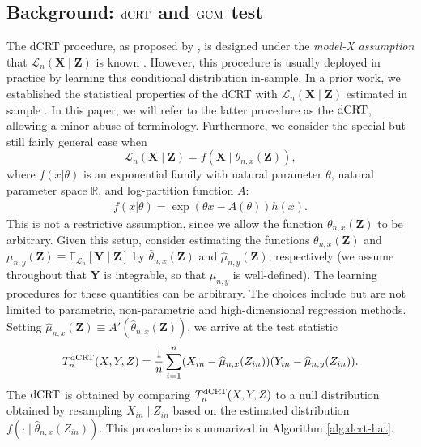 \documentclass[12pt]{article}
\theoremstyle{definition}
\newcommand{\E}{\mathbb E}								%
\newcommand{\R}{\mathbb{R}}								%
\newcommand{\prx}{\bm X}								%
\newcommand{\srx}{X}									%
\newcommand{\prz}{\bm Z}								%
\newcommand{\srz}{Z}									%
\newcommand{\pry}{{\bm Y}}								%
\newcommand{\sry}{Y}									%
\newcommand{\law}{\mathcal L}							%
\newcommand{\dCRT}{\textnormal{dCRT}} 					%
\newcommand{\GCM}{\textnormal{GCM}}						%
\begin{document}
\subsection{Background: $\dCRT$ and $\GCM$ test}\label{sec:background}

The dCRT procedure, as proposed by \citet{Liu2022a}, is designed under the \textit{model-X assumption} that $\law_n(\prx \mid \prz)$ is known \citep{CetL16}. However, this procedure is usually deployed in practice by learning this conditional distribution in-sample. In a prior work, we established the statistical properties of the dCRT with $\law_n(\prx \mid \prz)$ estimated in sample \citep{Niu2022a}. In this paper, we will refer to the latter procedure as the $\dCRT$, allowing a minor abuse of terminology. Furthermore, we consider the special but still fairly general case when 
\begin{equation}
\law_n(\prx \mid \prz) = f(\prx \mid \theta_{n,x}(\prz)), 
\end{equation}
where $f(x|\theta)$ is an exponential family with natural parameter $\theta$, natural parameter space $\R$, and log-partition function $A$:
\begin{align}\label{eq:NEF}
f(x|\theta)=\exp(\theta x -A(\theta))h(x).
\end{align}
This is not a restrictive assumption, since we allow the function $\theta_{n,x}(\prz)$ to be arbitrary. Given this setup, consider estimating the functions $\theta_{n,x}(\prz)$ and $\mu_{n,y}(\prz) \equiv \E_{\law_n}[\pry \mid \prz]$ by $\widehat{\theta}_{n,x}(\prz)$ and $\widehat \mu_{n,y}(\prz)$, respectively (we assume throughout that $\pry$ is integrable, so that $\mu_{n,y}$ is well-defined). The learning procedures for these quantities can be arbitrary. The choices include but are not limited to parametric, non-parametric and high-dimensional regression methods. Setting $\widehat \mu_{n,x}(\prz) \equiv A'(\widehat{\theta}_{n,x}(\prz))$, we arrive at the test statistic 
\begin{align}\label{eq:dCRThat}
	T_n^{\dCRT}(X,Y,Z)
  =\frac{1}{n}\sum_{i=1}^{n}(\srx_{in}-\widehat\mu_{n,x}(\srz_{in}))(\sry_{in}-\widehat{\mu}_{n,y}(\srz_{in})).
\end{align}
The $\dCRT$ is obtained by comparing $T_n^{\dCRT}(\srx, \sry, \srz)$ to a null distribution obtained by resampling $\srx_{in} \mid \srz_{in}$ based on the estimated distribution $f(\cdot \mid \widehat \theta_{n,x}(Z_{in})).$ This procedure is summarized in Algorithm \ref{alg:dcrt-hat}. 
\end{document}
